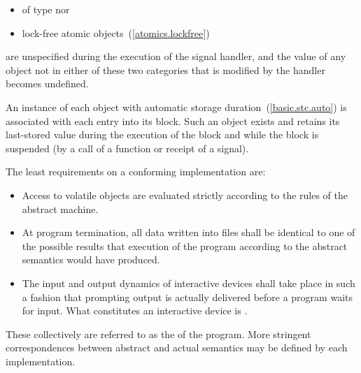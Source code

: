 \begin{itemize}
\item of type  nor
\item lock-free atomic objects~(\ref{atomics.lockfree})
\end{itemize}

are unspecified during the execution of the signal handler, and the value of any
object not in either of these two categories that is modified by the handler
becomes undefined.%

\pnum
An instance of each object with automatic storage
duration~(\ref{basic.stc.auto}) is associated with each entry into its
block. Such an object exists and retains its last-stored value during
the execution of the block and while the block is suspended (by a call
of a function or receipt of a signal).

\pnum
The least requirements on a conforming implementation are:

\begin{itemize}

\item
Access to volatile objects are evaluated strictly according to the
rules of the abstract machine.

\item
At program termination, all data written into files shall be
identical to one of the possible results that execution of the program
according to the abstract semantics would have produced.

\item
The input and output dynamics of interactive devices shall take
place in such a fashion that prompting output is actually delivered before a program waits for input. What constitutes an interactive device is
.

\end{itemize}

These collectively are referred to as the
 of the program.
\enternote More stringent correspondences between abstract and actual
semantics may be defined by each implementation. \exitnote


